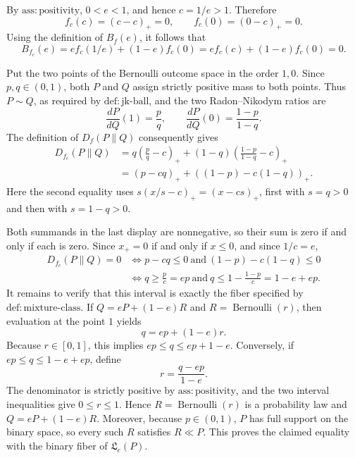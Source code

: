 By \(\mathrm{ass:positivity}\), \(0<e<1\), and hence \(c=1/e>1\).  Therefore
\[
f_c(c)=(c-c)_+=0,
\qquad
f_c(0)=(0-c)_+=0.
\]
Using the definition of \(B_f(e)\), it follows that
\[
B_{f_c}(e)=e f_c(1/e)+(1-e)f_c(0)
=e f_c(c)+(1-e)f_c(0)=0.
\]

Put the two points of the Bernoulli outcome space in the order \(1,0\).  Since
\(p,q\in(0,1)\), both \(P\) and \(Q\) assign strictly positive mass to both
points.  Thus \(P\sim Q\), as required by \(\mathrm{def:jk\text{-}ball}\), and
the two Radon--Nikodym ratios are
\[
\frac{dP}{dQ}(1)=\frac pq,
\qquad
\frac{dP}{dQ}(0)=\frac{1-p}{1-q}.
\]
The definition of \(D_f(P\|Q)\) consequently gives
\[
\begin{aligned}
D_{f_c}(P\|Q)
&=q\left(\frac pq-c\right)_+
 +(1-q)\left(\frac{1-p}{1-q}-c\right)_+\\
&=(p-cq)_+ + ((1-p)-c(1-q))_+.
\end{aligned}
\]
Here the second equality uses \(s(x/s-c)_+=(x-cs)_+\), first with
\(s=q>0\) and then with \(s=1-q>0\).

Both summands in the last display are nonnegative, so their sum is zero if and
only if each is zero.  Since \(x_+=0\) if and only if \(x\le 0\), and since
\(1/c=e\),
\[
\begin{aligned}
D_{f_c}(P\|Q)=0
&\Longleftrightarrow p-cq\le0
 \ \text{and}\ (1-p)-c(1-q)\le0\\
&\Longleftrightarrow q\ge \frac pc=ep
 \ \text{and}\ q\le 1-\frac{1-p}{c}=1-e+ep.
\end{aligned}
\]
It remains to verify that this interval is exactly the fiber specified by
\(\mathrm{def:mixture\text{-}class}\).  If
\(Q=eP+(1-e)R\) and \(R=\operatorname{Bernoulli}(r)\), then evaluation at
the point \(1\) yields
\[
q=ep+(1-e)r.
\]
Because \(r\in[0,1]\), this implies \(ep\le q\le ep+1-e\).  Conversely, if
\(ep\le q\le1-e+ep\), define
\[
r=\frac{q-ep}{1-e}.
\]
The denominator is strictly positive by \(\mathrm{ass:positivity}\), and the
two interval inequalities give \(0\le r\le1\).  Hence
\(R=\operatorname{Bernoulli}(r)\) is a probability law and
\(Q=eP+(1-e)R\).  Moreover, because \(p\in(0,1)\), \(P\) has full support on
the binary space, so every such \(R\) satisfies \(R\ll P\).  This proves the
claimed equality with the binary fiber of \(\mathfrak L_e(P)\).

